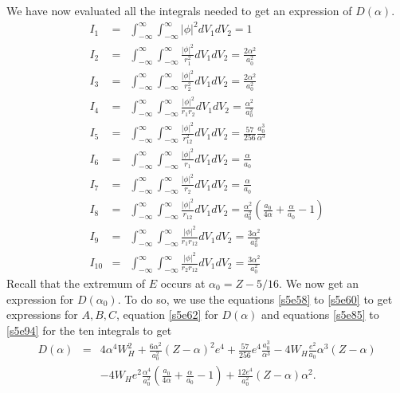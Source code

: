 \documentclass{article}
\numberwithin{equation}{section}
\begin{document}
We have now evaluated all the integrals needed to get an expression of
$D(\alpha)$.
\begin{eqnarray}
I_1 &=& \int_{-\infty}^\infty\int_{-\infty}^\infty |\phi|^2 dV_1 dV_2 
 = 1 \label{s5e85} \\
I_2 &=& \int_{-\infty}^\infty\int_{-\infty}^\infty\frac{|\phi|^2}{r_1^2}
        dV_1dV_2 = \frac{2\alpha^2}{a_0^2} \label{s5e86}\\
I_3 &=& \int_{-\infty}^\infty\int_{-\infty}^\infty\frac{|\phi|^2}{r_2^2}
        dV_1dV_2 = \frac{2\alpha^2}{a_0^2} \label{s5e87}\\
I_4 &=& \int_{-\infty}^\infty\int_{-\infty}^\infty\frac{|\phi|^2}{r_1r_2}
        dV_1dV_2 = \frac{\alpha^2}{a_0^2} \label{s5e88}\\
I_5 &=& \int_{-\infty}^\infty\int_{-\infty}^\infty\frac{|\phi|^2}{r_{12}^2}
        dV_1dV_2 = \frac{57}{256}\frac{a_0^3}{\alpha^3} \label{s5e89}\\
I_6 &=& \int_{-\infty}^\infty\int_{-\infty}^\infty\frac{|\phi|^2}{r_1}
        dV_1dV_2 = \frac{\alpha}{a_0} \label{s5e90} \\
I_7 &=& \int_{-\infty}^\infty\int_{-\infty}^\infty\frac{|\phi|^2}{r_2}
        dV_1dV_2 = \frac{\alpha}{a_0} \label{s5e91} \\
I_8 &=& \int_{-\infty}^\infty\int_{-\infty}^\infty\frac{|\phi|^2}{r_{12}}
        dV_1dV_2 = \frac{\alpha^2}{a_0^2}\left(\frac{a_0}{4\alpha} + 
	\frac{\alpha}{a_0}- 1 \right) \label{s5e92}\\
I_9 &=& \int_{-\infty}^\infty\int_{-\infty}^\infty\frac{|\phi|^2}
        {r_1r_{12}}dV_1dV_2 = \frac{3\alpha^2}{a_0^2} \label{s5e93}\\
I_{10} &=& \int_{-\infty}^\infty\int_{-\infty}^\infty\frac{|\phi|^2}
        {r_2r_{12}}dV_1dV_2 = \frac{3\alpha^2}{a_0^2} \label{s5e94}
\end{eqnarray}
Recall that the extremum of $E$ occurs at $\alpha_0 = Z - 5/16$. We now
get an expression for $D(\alpha_0)$. To do so, we use the equations 
\eqref{s5e58} to \eqref{s5e60} to get expressions for $A, B, C$, 
equation \eqref{s5e62} for $D(\alpha)$ and equations \eqref{s5e85} to
\eqref{s5e94} for the ten integrals to get
\begin{eqnarray*}
D(\alpha) &=& 4\alpha^4W_H^2 + \frac{6\alpha^2}{a_0^2}(Z - \alpha)^2e^4
 + \frac{57}{256}e^4\frac{a_0^3}{\alpha^3} - 4W_H\frac{e^2}{a_0}
 \alpha^3(Z - \alpha) \\
 & & -4W_He^2\frac{\alpha^4}{a_0^2}\left(\frac{a_0}{4\alpha} +
    \frac{\alpha}{a_0} - 1\right) + \frac{12e^4}{a_0^2}(Z - \alpha)
    \alpha^2.
\end{eqnarray*}
\end{document}
